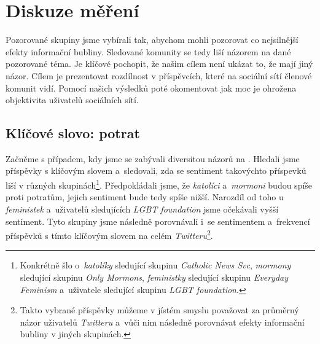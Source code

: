\documentclass[12pt, a4paper]{article}
\numberwithin{equation}{section} 	%
\begin{document}
\newpage
\section{Diskuze měření}
\noindent Pozorované skupiny jsme vybírali tak, abychom mohli pozorovat co nejsilnější efekty informační bubliny. Sledované komunity se tedy liší názorem na dané pozorované téma.  Je klíčové pochopit, že našim cílem není ukázat to, že mají jiný názor. Cílem je prezentovat rozdílnost v příspěvcích, které na sociální sítí členové komunit vidí. Pomocí našich výsledků poté okomentovat jak moc je ohrožena objektivita uživatelů sociálních sítí.

\subsection{Klíčové slovo: potrat}\label{subsec:abortion}
\noindent Začněme s případem, kdy jsme se zabývali diversitou názorů na \textit{}. Hledali jsme příspěvky s klíčovým slovem \textit{} a~sledovali, zda se sentiment takovýchto příspevků liší v různých skupinách\footnote{Konkrétně šlo o~\textit{katolíky} sledující skupinu \textit{Catholic News Svc}, \textit{mormony} sledující skupinu \textit{Only Mormons}, \textit{feministky} sledující skupinu \textit{Everyday Feminism} a~uživatele sledující skupinu \textit{LGBT foundation}.}. Předpokládali jsme, že \textit{katolíci} a~\textit{mormoni} budou spíše proti potratům, jejich sentiment bude tedy spíše nižší. Narozdíl od toho u \textit{feministek} a~uživatelů sledujících \textit{LGBT foundation} jsme očekávali vyšší sentiment. Tyto skupiny jsme následně porovnávali i~se sentimentem a~frekvencí příspěvků s tímto klíčovým slovem na celém \textit{Twitteru}\footnote{Takto vybrané příspěvky můžeme v jístém smyslu považovat za průměrný názor uživatelů \textit{Twitteru} a~vůči nim následně porovnávat efekty informační bubliny v jiných skupinách.}.
\end{document}
